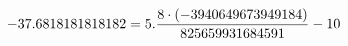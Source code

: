 \documentclass[preview]{standalone}
\begin{document}
\begin{align*}
\special{dvisvgm:raw <g id='unique000'>}-37.6818181818182 = 5.\frac{8 \cdot (-3940649673949184)}{825659931684591} - 10\special{dvisvgm:raw </g>}
\end{align*}
\end{document}

